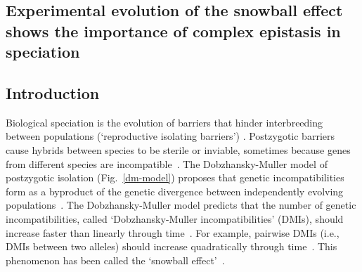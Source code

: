 \begin{doublespace}

\chapter{Experimental evolution of the snowball effect
  shows the importance of complex epistasis in speciation}
\label{chap:snowball}



\section{Introduction}


Biological speciation is the evolution of barriers that hinder interbreeding
between populations (`reproductive isolating barriers') \citep{coy04}.
%
Postzygotic barriers cause hybrids between species to be sterile or inviable,
sometimes because genes from different species are incompatible~\citep{coy04}.
%
The Dob\-zhan\-sky-Mul\-ler model of postzygotic isolation (Fig.~\ref{dm-model})
proposes that genetic incompatibilities form as a byproduct of the genetic
divergence between independently evolving populations~\citep{orr95}.
%
The Dob\-zhan\-sky-Mul\-ler model predicts that the number of genetic
incompatibilities, called `Dob\-zhan\-sky-Mul\-ler incompatibilities' (DMIs),
should increase faster than linearly through time~\citep{orr95,orr01}.
%
For example, pairwise DMIs (i.e., DMIs between two alleles)
should increase quadratically through time~\citep{orr01}.
%
This phenomenon has been called the `snowball effect'~\citep{coy04}.




\end{doublespace}
